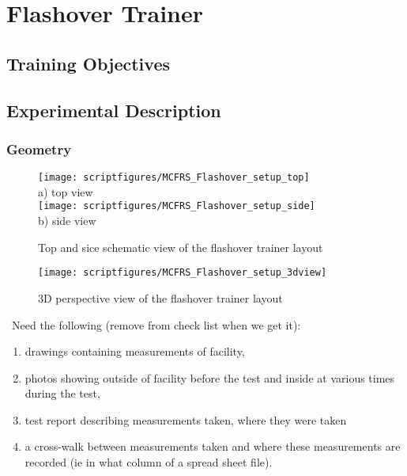 \chapter{Flashover Trainer}

\section{Training Objectives}

\section{Experimental Description}
\subsection{Geometry}

\begin{figure}[\figoptions]
\begin{center}
\texttt{[image: scriptfigures/MCFRS\_Flashover\_setup\_top]}\\
a) top view\\
\texttt{[image: scriptfigures/MCFRS\_Flashover\_setup\_side]}\\
b) side view\\
\end{center}
\caption {Top and sice schematic view of the flashover trainer layout}
\label{figflashoverplan}%
\end{figure}

\begin{figure}[\figoptions]
\begin{center}
\texttt{[image: scriptfigures/MCFRS\_Flashover\_setup\_3dview]}\\
\end{center}
\caption {3D perspective view of the flashover trainer layout}
\label{figflashoverplan}%
\end{figure}

\note\ Need the following (remove from check list when we get it):
\begin{enumerate}
\item drawings containing measurements of facility,
\item photos showing outside of facility before the test and inside at various times during the test,
\item test report describing
measurements taken, where they were taken
\item a cross-walk between measurements taken and where these measurements are recorded (ie
in what column of a spread sheet file).
\end{enumerate}

